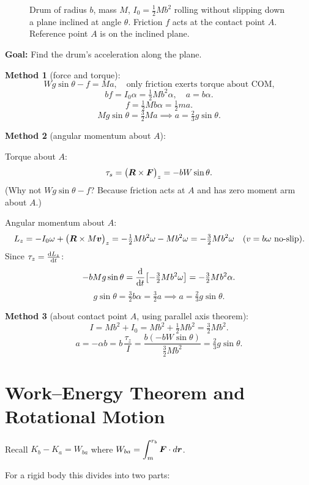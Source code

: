 \begin{example}

\begin{figure}[H]
    \centering
    \caption{Drum of radius $b$, mass $M$, $I_0 = \tfrac{1}{2}Mb^2$ rolling
             without slipping down a plane inclined at angle $\theta$.
             Friction $f$ acts at the contact point $A$.
             Reference point $A$ is on the inclined plane.}
\end{figure}

\textbf{Goal:} Find the drum's acceleration along the plane.

\textbf{Method 1} (force and torque):
\[
    Wg\sin\theta - f = Ma, \quad\text{only friction exerts torque about COM,}
\]
\[
    bf = I_0\alpha = \tfrac{1}{2}Mb^2\alpha, \quad a = b\alpha.
\]
\[
    f = \tfrac{1}{2}Mb\alpha = \tfrac{1}{2}ma.
\]
\[
    Mg\sin\theta = \tfrac{3}{2}Ma \implies \boxed{a = \tfrac{2}{3}g\sin\theta.}
\]

\textbf{Method 2} (angular momentum about $A$):

Torque about $A$:
\[
    \tau_s = \bigl(\vect{R}\times\vect{F}\bigr)_z = -bW\sin\theta.
\]
(Why not $Wg\sin\theta - f$? Because friction acts at $A$ and has zero moment arm about $A$.)

Angular momentum about $A$:
\[
    L_z = -I_0\omega + \bigl(\vect{R}\times M\lvect{v}\bigr)_z
    = -\tfrac{1}{2}Mb^2\omega - Mb^2\omega = -\tfrac{3}{2}Mb^2\omega
    \quad (v = b\omega\text{ no-slip}).
\]
Since $\tau_z = \dv{L_z}{t}$:
\[
    -bMg\sin\theta = \dv{}{t}\!\left[-\tfrac{3}{2}Mb^2\omega\right] = -\tfrac{3}{2}Mb^2\alpha.
\]
\[
    g\sin\theta = \tfrac{3}{2}b\alpha = \tfrac{3}{2}a \implies \boxed{a = \tfrac{2}{3}g\sin\theta.}
\]

\textbf{Method 3} (about contact point $A$, using parallel axis theorem):
\[
    I = Mb^2 + I_0 = Mb^2 + \tfrac{1}{2}Mb^2 = \tfrac{3}{2}Mb^2.
\]
\[
    a = -\alpha b = b\,\frac{\tau_z}{I}
    = \frac{b(-bW\sin\theta)}{\tfrac{3}{2}Mb^2} = \boxed{\tfrac{2}{3}g\sin\theta.}
\]
\end{example}

\section{Work--Energy Theorem and Rotational Motion}

Recall $K_b - K_a = W_{ba}$ where $W_{ba} = \displaystyle\int_m^{r_b}\vect{F}\cdot d\lvect{r}$.

For a rigid body this divides into two parts:

